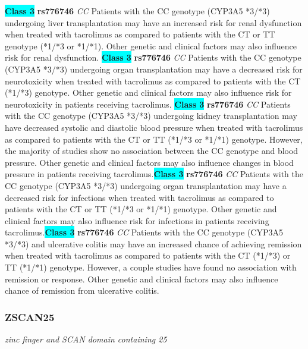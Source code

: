 \documentclass{report}
\begin{document}
\textbf{\colorbox{cyan} {Class 3}} \textbf{ rs776746 } \textit{ CC }
Patients with the CC genotype (CYP3A5 *3/*3) undergoing liver transplantation may have an increased risk for renal dysfunction when treated with tacrolimus as compared to patients with the CT or TT genotype (*1/*3 or *1/*1). Other genetic and clinical factors may also influence risk for renal dysfunction. \newline\textbf{\colorbox{cyan} {Class 3}} \textbf{ rs776746 } \textit{ CC }
Patients with the CC genotype (CYP3A5 *3/*3) undergoing organ transplantation may have a decreased risk for neurotoxicity when treated with tacrolimus as compared to patients with the CT (*1/*3) genotype. Other genetic and clinical factors may also influence risk for neurotoxicity in patients receiving tacrolimus. \newline\textbf{\colorbox{cyan} {Class 3}} \textbf{ rs776746 } \textit{ CC }
Patients with the CC genotype (CYP3A5 *3/*3) undergoing kidney transplantation may have decreased systolic and diastolic blood pressure when treated with tacrolimus as compared to patients with the CT or TT (*1/*3 or *1/*1) genotype. However, the majority of studies show no association between the CC genotype and blood pressure. Other genetic and clinical factors may also influence changes in blood pressure in patients receiving tacrolimus.\newline\textbf{\colorbox{cyan} {Class 3}} \textbf{ rs776746 } \textit{ CC }
Patients with the CC genotype (CYP3A5 *3/*3) undergoing organ transplantation may have a decreased risk for infections when treated with tacrolimus as compared to patients with the CT or TT (*1/*3 or *1/*1) genotype. Other genetic and clinical factors may also influence risk for infections in patients receiving tacrolimus.\newline\textbf{\colorbox{cyan} {Class 3}} \textbf{ rs776746 } \textit{ CC }
Patients with the CC genotype (CYP3A5 *3/*3) and ulcerative colitis may have an increased chance of achieving remission when treated with tacrolimus as compared to patients with the CT (*1/*3) or TT (*1/*1) genotype. However, a couple studies have found no association with remission or response. Other genetic and clinical factors may also influence chance of remission from ulcerative colitis. \newline\subsubsection{ ZSCAN25 }
\textit{ zinc finger and SCAN domain containing 25 }
\end{document}
